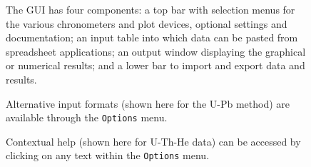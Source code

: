 \documentclass{article}
\begin{document}
\begin{figure}[!ht]
  \centering
  \label{fig:GUI}
  \caption{The GUI has four components: a top bar with selection menus
    for the various chronometers and plot devices, optional settings
    and documentation; an input table into which data can be pasted
    from spreadsheet applications; an output window displaying the
    graphical or numerical results; and a lower bar to import and
    export data and results.}
\end{figure}

\begin{figure}[!ht]
  \centering
  \label{fig:input}
  \caption{Alternative input formats (shown here for the U-Pb method)
    are available through the \texttt{Options} menu.}
\end{figure}

\begin{figure}[!ht]
  \centering
  \label{fig:contextualhelp}
  \caption{Contextual help (shown here for U-Th-He data) can be
    accessed by clicking on any text within the \texttt{Options}
    menu.}
\end{figure}
\end{document}

